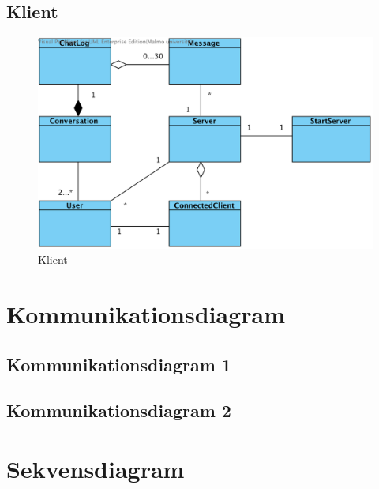 \documentclass[a4paper,11pt]{article}
\begin{document}
\subsection{Klient}
	\begin{figure}[H]
		\centering
		\includegraphics[width=\textwidth]{diagram/Server.png}
		\caption{Klient}
	\end{figure}
\section{Kommunikationsdiagram}
\subsection{Kommunikationsdiagram 1}
\subsection{Kommunikationsdiagram 2}
\section{Sekvensdiagram}
\end{document}
